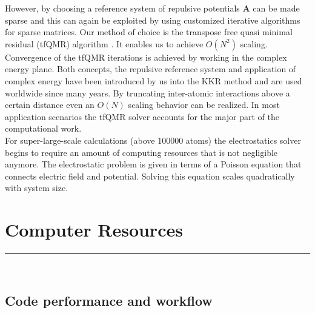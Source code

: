 \documentclass [a4paper, 12pt]{article}
\newcommand{\matr}[1]{\bm{#1}}
\begin{document}
However, by choosing a reference system of repulsive potentials
$\matr{A}$ can be made sparse and this can again be exploited
by using customized iterative algorithms for sparse matrices.
Our method of choice is the transpose free quasi minimal residual (tfQMR) algorithm \cite{freund_qmr:_1991}.
It enables us to achieve $O(N^2)$ scaling. 
Convergence of the tfQMR iterations is achieved by working in the complex energy plane. Both concepts,
the repulsive reference system and application of complex energy have been
introduced by us into the KKR method \cite{zeller_application_1982,zeller_theory_1995}
and are used worldwide since many years. 
By truncating inter-atomic interactions above a certain distance even an $O(N)$ scaling 
behavior can be realized.
In most application scenarios the tfQMR solver accounts for the major part of the computational work.
\\
For super-large-scale calculations (above 100000 atoms) the electrostatics solver begins
to require an amount of computing resources that is not negligible anymore. 
The electrostatic problem is given in terms of a Poisson equation that connects electric field and potential. 
Solving this equation scales quadratically with system size. 


\section{Computer Resources}
\rule{\textwidth}{0.4pt}\\
\subsection{Code performance and workflow}
\end{document}

